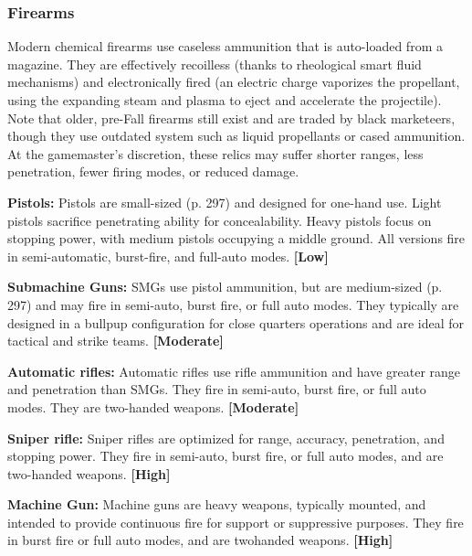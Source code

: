 \subsubsection{Firearms} 

Modern chemical firearms use caseless ammunition that is auto-loaded from a magazine. They are effectively recoilless (thanks to rheological smart fluid mechanisms) and electronically fired (an electric charge vaporizes the propellant, using the expanding steam and plasma to eject and accelerate the projectile). Note that older, pre-Fall firearms still exist and are traded by black marketeers, though they use outdated system such as liquid propellants or cased ammunition. At the gamemaster’s discretion, these relics may suffer shorter ranges, less penetration, fewer firing modes, or reduced damage. 

\textbf{Pistols:} Pistols are small-sized (p. 297) and designed for one-hand use. Light pistols sacrifice penetrating ability for concealability. Heavy pistols focus on stopping power, with medium pistols occupying a middle ground. All versions fire in semi-automatic, burst-fire, and full-auto modes. \textbf{[Low]} 

\textbf{Submachine Guns:} SMGs use pistol ammunition, but are medium-sized (p. 297) and may fire in semi-auto, burst fire, or full auto modes. They typically are designed in a bullpup configuration for close quarters operations and are ideal for tactical and strike teams. \textbf{[Moderate]} 

\textbf{Automatic rifles:} Automatic rifles use rifle ammunition and have greater range and penetration than SMGs. They fire in semi-auto, burst fire, or full auto modes. They are two-handed weapons. \textbf{[Moderate]} 

\textbf{Sniper rifle:} Sniper rifles are optimized for range, accuracy, penetration, and stopping power. They fire in semi-auto, burst fire, or full auto modes, and are two-handed weapons. \textbf{[High]} 

\textbf{Machine Gun:} Machine guns are heavy weapons, typically mounted, and intended to provide continuous fire for support or suppressive purposes. They fire in burst fire or full auto modes, and are twohanded weapons. \textbf{[High]} 

